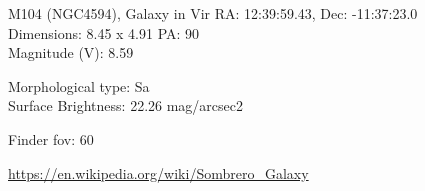 \begin{block}{M104 (NGC4594), Galaxy in Vir}
    RA: 12:39:59.43, Dec: -11:37:23.0 \\ 
    Dimensions: 8.45 x 4.91 PA: 90 \\ 
    Magnitude (V): 8.59

    Morphological type: Sa \\ 
    Surface Brightness: 22.26 mag/arcsec2 


    Finder fov: 60 

    \url{https://en.wikipedia.org/wiki/Sombrero_Galaxy} 
\end{block}